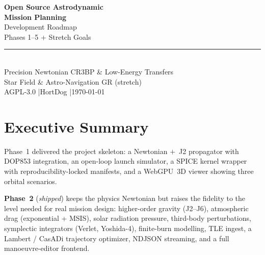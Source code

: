 \documentclass[11pt, a4paper]{article}
\begin{document}
\begin{titlepage}
  \pagecolor{darkbg}
  \color{phosphor}
  \vspace*{3cm}
  \begin{center}
    {\Huge\bfseries Open Source Astrodynamic\\[0.3em]
     Mission Planning}\\[1.5em]
    {\LARGE\color{accentcyan} Development Roadmap}\\[0.8em]
    {\large Phases 1--5 + Stretch Goals}\\[3cm]
    \textcolor{phosphor!60!black}{\rule{0.5\textwidth}{0.4pt}}\\[1em]
    {\normalsize
      Precision Newtonian \quad\textbullet\quad CR3BP \&
      Low-Energy Transfers \quad\textbullet\quad\\[0.2em]
      Star Field \& Astro-Navigation \quad\textbullet\quad GR (stretch)}\\[2em]
    {\small\color{phosphor!60!black}
      AGPL-3.0 \quad|\quad HortDog \quad|\quad \today}
  \end{center}
\end{titlepage}

\pagecolor{white}
\color{black}

\tableofcontents
\newpage

\section{Executive Summary}

Phase~1 delivered the project skeleton: a Newtonian $+$~J2 propagator with
DOP853 integration, an open-loop launch simulator, a SPICE kernel wrapper with
reproducibility-locked manifests, and a WebGPU~3D viewer showing three orbital
scenarios.

\textbf{Phase~2} (\emph{shipped}) keeps the physics Newtonian but raises the
fidelity to the level needed for real mission design: higher-order gravity
(J2--J6), atmospheric drag (exponential + MSIS), solar radiation pressure,
third-body perturbations, symplectic integrators (Verlet, Yoshida-4),
finite-burn modelling, TLE ingest, a Lambert / CasADi trajectory optimizer,
NDJSON streaming, and a full manoeuvre-editor frontend.
\end{document}

